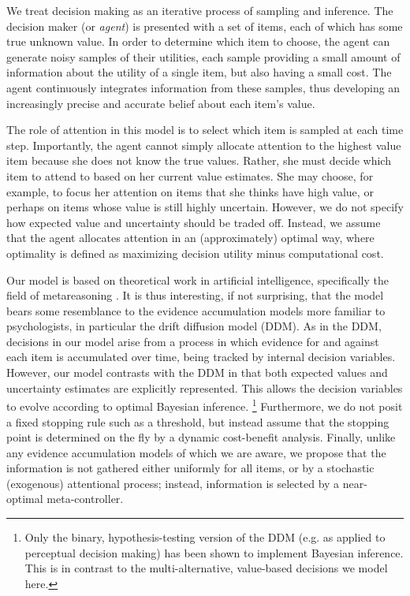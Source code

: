 \documentclass[11pt]{article} %
\begin{document}
We treat decision making as an iterative process of sampling and inference. The decision maker (or \emph{agent}) is presented with a set of items, each of which has some true unknown value. In order to determine which item to choose, the agent can generate noisy samples of their utilities, each sample providing a small amount of information about the utility of a single item, but also having a small cost. The agent continuously integrates information from these samples, thus developing an increasingly precise and accurate belief about each item's value.

The role of attention in this model is to select which item is sampled at each time step. 
Importantly, the agent cannot simply allocate attention to the highest value item because she does not know the true values. Rather, she must decide which item to attend to based on her current value estimates. She may choose, for example, to focus her attention on items that she thinks have high value, or perhaps on items whose value is still highly uncertain. However, we do not specify how expected value and uncertainty should be traded off. Instead, we assume that the agent allocates attention in an (approximately) optimal way, where optimality is defined as maximizing decision utility minus computational cost.


Our model is based on theoretical work in artificial intelligence, specifically the field of metareasoning \citep{russell91}. It is thus interesting, if not surprising, that the model bears some resemblance to the evidence accumulation models more familiar to psychologists, in particular the drift diffusion model (DDM). As in the DDM, decisions in our model arise from a process in which evidence for and against each item is accumulated over time, being tracked by internal decision variables. However, our model contrasts with the DDM in that both expected values and uncertainty estimates are explicitly represented. 
This allows the decision variables to evolve according to optimal Bayesian inference.%
  \footnote{Only the binary, hypothesis-testing version of the DDM (e.g. as applied to perceptual decision making) has been shown to implement Bayesian inference. This is in contrast to the multi-alternative, value-based decisions we model here.}
Furthermore, we do not posit a fixed stopping rule such as a threshold, but instead assume that the stopping point is determined on the fly by a dynamic cost-benefit analysis. Finally, unlike any evidence accumulation models of which we are aware, we propose that the information is not gathered either uniformly for all items, or by a stochastic (exogenous) attentional process; instead, information is selected by a near-optimal meta-controller.
\end{document}
